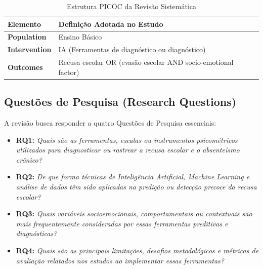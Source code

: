 \documentclass[journal,10pt,a4paper]{IEEEtran}
\begin{document}
\begin{table}[htbp]
\caption{Estrutura PICOC da Revisão Sistemática}
\label{tab:picoc}
\centering
\small
\begin{tabularx}{\columnwidth}{lX}
\toprule
\textbf{Elemento} & \textbf{Definição Adotada no Estudo} \\
\midrule
\textbf{Population} & Ensino Básico \\
\textbf{Intervention} & IA (Ferramentas de diagnóstico ou diagnóstico) \\
\textbf{Outcomes} & Recusa escolar OR (evasão escolar AND socio-emotional factor) \\
\bottomrule
\end{tabularx}
\end{table}

\subsection{Questões de Pesquisa (Research Questions)}
A revisão busca responder a quatro Questões de Pesquisa essenciais:
\begin{itemize}
    \item \textbf{RQ1:} \textit{Quais são as ferramentas, escalas ou instrumentos psicométricos utilizados para diagnosticar ou rastrear a recusa escolar e o absenteísmo crônico?}
    \item \textbf{RQ2:} \textit{De que forma técnicas de Inteligência Artificial, Machine Learning e análise de dados têm sido aplicadas na predição ou detecção precoce da recusa escolar?}
    \item \textbf{RQ3:} \textit{Quais variáveis socioemocionais, comportamentais ou contextuais são mais frequentemente consideradas por essas ferramentas preditivas e diagnósticas?}
    \item \textbf{RQ4:} \textit{Quais são as principais limitações, desafios metodológicos e métricas de avaliação relatados nos estudos ao implementar essas ferramentas?}
\end{itemize}
\end{document}
